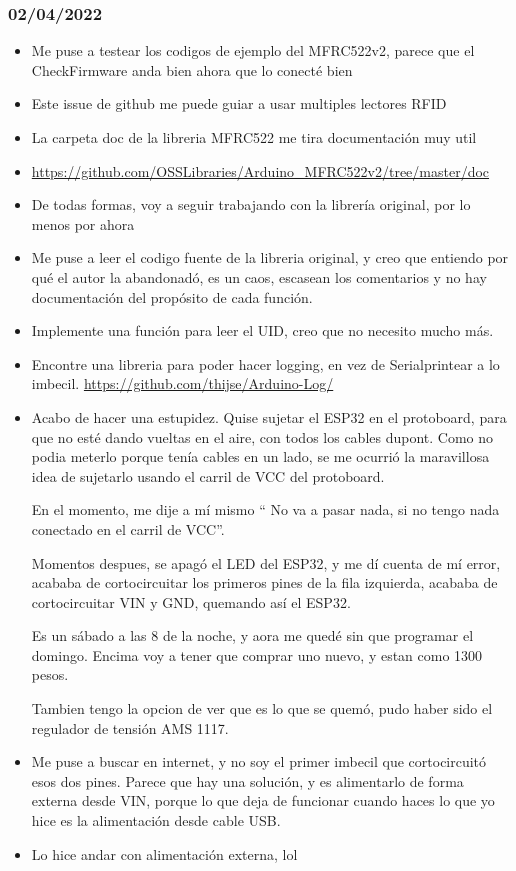 \documentclass[../informe_krapp.tex]{subfiles}
\begin{document}
\subsubsection{02/04/2022}
\begin{itemize}
	\item Me puse a testear los codigos de ejemplo del MFRC522v2, parece que el
	      CheckFirmware anda bien ahora que lo conecté bien
	\item Este issue de github me puede guiar a usar multiples lectores RFID
	\item La carpeta doc de la libreria MFRC522 me tira documentación muy util
	\item \url{https://github.com/OSSLibraries/Arduino_MFRC522v2/tree/master/doc}
	\item De todas formas, voy a seguir trabajando con la librería original, por lo menos
	      por ahora
	\item Me puse a leer el codigo fuente de la libreria original, y creo que entiendo por
	      qué el autor la abandonadó, es un caos, escasean los comentarios
	      y no hay documentación del propósito de cada función.
	\item Implemente una función para leer el UID, creo que no necesito mucho más.

	\item Encontre una libreria para poder hacer logging, en vez de Serialprintear a
	      lo imbecil. \url{https://github.com/thijse/Arduino-Log/}

	\item Acabo de hacer una estupidez. Quise sujetar el ESP32 en el protoboard,
	      para que no esté dando vueltas en el aire, con todos los cables dupont.
	      Como no podia meterlo porque tenía cables en un lado, se me ocurrió la
	      maravillosa idea de sujetarlo usando el carril de VCC del protoboard.

	      En el momento, me dije a mí mismo `` No va a pasar nada, si no tengo nada
	      conectado en el carril de VCC''.

	      Momentos despues, se apagó el LED del ESP32, y me dí cuenta de mí error,
	      acababa de cortocircuitar los primeros pines de la fila izquierda,
	      acababa de cortocircuitar VIN y GND, quemando así el ESP32.

	      Es un sábado a las 8 de la noche, y aora me quedé sin que programar el domingo.
	      Encima voy a tener que comprar uno nuevo, y estan como 1300 pesos.

	      Tambien tengo la opcion de ver que es lo que se quemó, pudo haber sido
	      el regulador de tensión AMS 1117.

	\item Me puse a buscar en internet, y no soy el primer imbecil que cortocircuitó
	      esos dos pines. Parece que hay una solución, y es alimentarlo de forma externa
	      desde VIN, porque lo que deja de funcionar cuando haces lo que yo hice
	      es la alimentación desde cable USB.

	\item Lo hice andar con alimentación externa, lol


\end{itemize}
\end{document}
